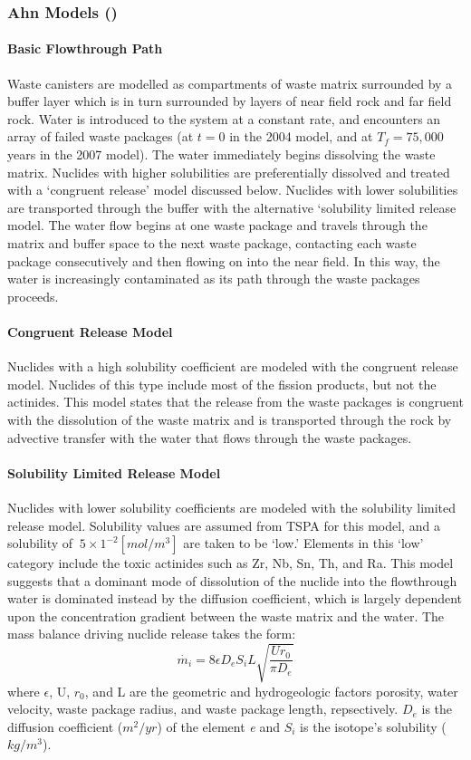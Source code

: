 \subsubsection{Ahn Models (\cite{ahn_environmental_2004, ahn_environmental_2007})}

\paragraph{Basic Flowthrough Path}
Waste canisters are modelled as compartments of waste matrix surrounded by a buffer layer which is 
in turn surrounded by layers of near field rock and far field rock. Water is introduced to the 
system at a constant rate, and encounters an array of failed waste packages (at $t=0$ in the 2004 
model, and at $T_f=75,000$ years in the 2007 model). The water immediately begins dissolving the 
waste matrix. Nuclides with higher solubilities are preferentially dissolved and treated with a 
`congruent release' model discussed below. Nuclides with lower solubilities are transported through 
the buffer with the alternative `solubility limited release model. The water flow begins at one 
waste package and travels through the matrix and buffer space to the next waste package, contacting 
each waste package consecutively and then flowing on into the near field. In this way, the water is 
increasingly contaminated as its path through the waste packages proceeds.  \paragraph{Congruent 
Release Model} Nuclides with a high solubility coefficient are modeled with the congruent release 
model. Nuclides of this type include most of the fission products, but not the actinides. This model 
states that the release from the waste packages is congruent with the dissolution of the waste 
matrix and is transported through the rock by advective transfer with the water that flows through 
the waste packages.  \paragraph{Solubility Limited Release Model}
Nuclides with lower solubility coefficients are modeled with the solubility limited release model.  
Solubility values are assumed from TSPA for this model, and a solubility of $~5\times 1^{-2} 
[mol/m^3]$ are taken to be `low.' Elements in this `low' category include the toxic actinides such 
as Zr, Nb, Sn, Th, and Ra. This model suggests that a dominant mode of dissolution of the nuclide 
into the flowthrough water is dominated instead by the diffusion coefficient, which is largely 
dependent upon the concentration gradient between the waste matrix and the water. The mass balance 
driving nuclide release takes the form:
\begin{equation}
\dot{m_i}=8\epsilon D_eS_iL\sqrt{\frac{Ur_0}{\pi D_e}}
\end{equation}
where $\epsilon$, U, $r_0$, and L are the geometric and hydrogeologic factors porosity, water 
velocity, waste package radius, and waste package length, repsectively. $D_e$ is the diffusion 
coefficient ($m^2/yr$) of the element \emph{e} and $S_i$ is the isotope's solubility ($kg/m^3$).

